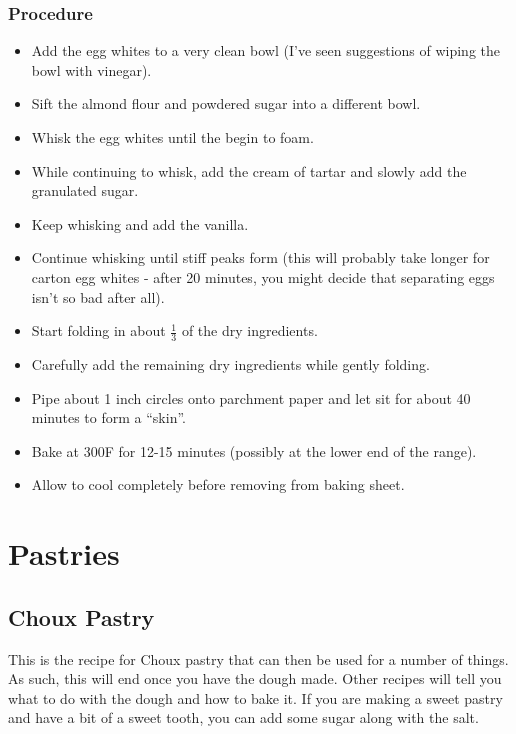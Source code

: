 \documentclass[10pt, openany]{book}
\begin{document}
\subsection{Procedure}
\begin{itemize}
  \item Add the egg whites to a very clean bowl (I've seen suggestions of wiping the bowl with vinegar).
  \item Sift the almond flour and powdered sugar into a different bowl.
  \item Whisk the egg whites until the begin to foam.
  \item While continuing to whisk, add the cream of tartar and slowly add the granulated sugar.
  \item Keep whisking and add the vanilla.
  \item Continue whisking until stiff peaks form (this will probably take longer for carton egg whites - after 20 minutes, you might decide that separating eggs isn't so bad after all).
  \item Start folding in about $\frac{1}{3}$ of the dry ingredients.
  \item Carefully add the remaining dry ingredients while gently folding.
  \item Pipe about 1 inch circles onto parchment paper and let sit for about 40 minutes to form a ``skin''.
  \item Bake at 300\degree{}F for 12-15 minutes (possibly at the lower end of the range).
  \item Allow to cool completely before removing from baking sheet.
\end{itemize}

\chapter{Pastries}

\section{Choux Pastry}
\label{pastry:choux}
This is the recipe for Choux pastry that can then be used for a number of things.  As such, this will end once you have the dough made.  Other recipes will tell you what to do with the dough and how to bake it.  If you are making a sweet pastry and have a bit of a sweet tooth, you can add some sugar along with the salt.
\end{document}
